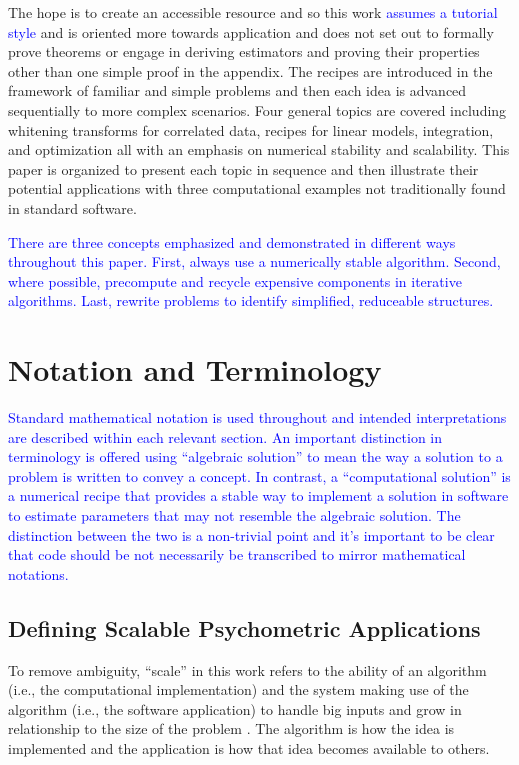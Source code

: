 \documentclass[12pt]{article}
\begin{document}
The hope is to create an accessible resource and so this work \textcolor{blue}{assumes a tutorial style} and is oriented more towards application and does not set out to formally prove theorems or engage in deriving estimators and proving their properties other than one simple proof in the appendix. The recipes are introduced in the framework of familiar and simple problems and then each idea is advanced sequentially to more complex scenarios. Four general topics are covered including whitening transforms for correlated data, recipes for linear models, integration, and optimization all with an emphasis on numerical stability and scalability. This paper is organized to present each topic in sequence and then illustrate their potential applications with three computational examples not traditionally found in standard software. 

\textcolor{blue}{There are three concepts emphasized and demonstrated in different ways throughout this paper. First, always use a numerically stable algorithm. Second, where possible, precompute and recycle expensive components in iterative algorithms. Last, rewrite problems to identify simplified, reduceable structures.}

\section*{Notation and Terminology} 

\textcolor{blue}{Standard mathematical notation is used throughout and intended interpretations are described within each relevant section. An important distinction in terminology is offered using ``algebraic solution'' to mean the way a solution to a problem is written to convey a concept. In contrast, a ``computational solution'' is a numerical recipe that provides a stable way to implement a solution in software to estimate parameters that may not resemble the algebraic solution. The distinction between the two is a non-trivial point and it's important to be clear that code should be not necessarily be transcribed to mirror mathematical notations.}                           

\subsection*{Defining Scalable Psychometric Applications}

To remove ambiguity, ``scale'' in this work refers to the ability of an algorithm (i.e., the computational implementation) and the system making use of the algorithm (i.e., the software application) to handle big inputs and grow in relationship to the size of the problem \cite{teng}. The algorithm is how the idea is implemented and the application is how that idea becomes available to others.
\end{document}
